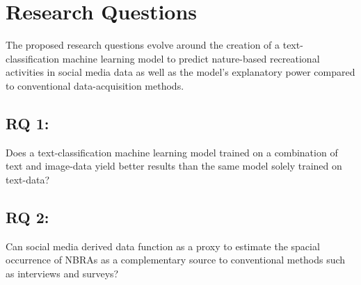 \chapter{Research Questions} \label{research_questions}
The proposed research questions evolve around the creation of a text-classification machine learning model to predict nature-based recreational activities in social media data as well as the model's explanatory power compared to conventional data-acquisition methods.

\section{RQ 1:}
Does a text-classification machine learning model trained on a combination of text and image-data yield better results than the same model solely trained on text-data?

\section{RQ 2:}
Can social media derived data function as a proxy to estimate the spacial occurrence of NBRAs as a complementary source to conventional methods such as interviews and surveys?




